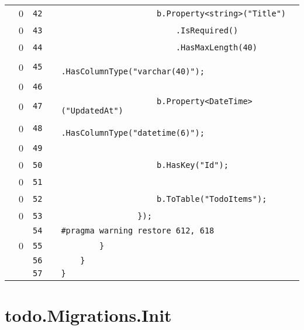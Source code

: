 \documentclass[a4paper,landscape,10pt]{article}
\begin{document}
\begin{longtable}[l]{lrrll}
\cellcolor{red} & 0 & \verb~42~ & & \verb~                    b.Property<string>("Title")~\\
\cellcolor{red} & 0 & \verb~43~ & & \verb~                        .IsRequired()~\\
\cellcolor{red} & 0 & \verb~44~ & & \verb~                        .HasMaxLength(40)~\\
\cellcolor{red} & 0 & \verb~45~ & & \verb~                        .HasColumnType("varchar(40)");~\\
\cellcolor{red} & 0 & \verb~46~ & & \verb~~\\
\cellcolor{red} & 0 & \verb~47~ & & \verb~                    b.Property<DateTime>("UpdatedAt")~\\
\cellcolor{red} & 0 & \verb~48~ & & \verb~                        .HasColumnType("datetime(6)");~\\
\cellcolor{red} & 0 & \verb~49~ & & \verb~~\\
\cellcolor{red} & 0 & \verb~50~ & & \verb~                    b.HasKey("Id");~\\
\cellcolor{red} & 0 & \verb~51~ & & \verb~~\\
\cellcolor{red} & 0 & \verb~52~ & & \verb~                    b.ToTable("TodoItems");~\\
\cellcolor{red} & 0 & \verb~53~ & & \verb~                });~\\
\cellcolor{gray} &  & \verb~54~ & & \verb~#pragma warning restore 612, 618~\\
\cellcolor{red} & 0 & \verb~55~ & & \verb~        }~\\
\cellcolor{gray} &  & \verb~56~ & & \verb~    }~\\
\cellcolor{gray} &  & \verb~57~ & & \verb~}~\\
\end{longtable}
\newpage
\section{todo.Migrations.Init}
\end{document}
